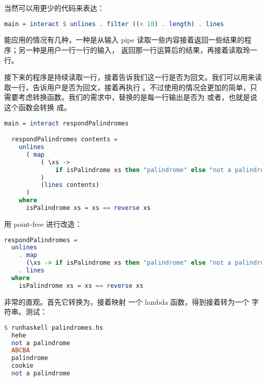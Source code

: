 \documentclass[./main.tex]{subfiles}
\begin{document}
当然可以用更少的代码来表达：

\begin{lstlisting}[language=Haskell]
  main = interact $ unlines . filter ((< 10) . length) . lines
\end{lstlisting}

能应用的情况有几种，一种是从输入 pipe 读取一些内容接着返回一些结果的程序；另一种是用户一行一行的输入，
返回那一行运算后的结果，再接着读取玲一行。

接下来的程序是持续读取一行，接着告诉我们这一行是否为回文。我们可以用来读取一行，告诉用户是否为回文，接着再执行
。不过使用的情况会更加的简单，只需要考虑转换函数。我们的需求中，替换的是每一行输出是否为
或者，也就是说这个函数会转换
成。

\begin{lstlisting}[language=Haskell]
  main = interact respondPalindromes

  respondPalindromes contents =
    unlines
      ( map
          ( \xs ->
              if isPalindrome xs then "palindrome" else "not a palindrome"
          )
          (lines contents)
      )
    where
      isPalindrome xs = xs == reverse xs
\end{lstlisting}

用 point-free 进行改造：

\begin{lstlisting}[language=Haskell]
  respondPalindromes =
  unlines
    . map
      (\xs -> if isPalindrome xs then "palindrome" else "not a palindrome")
    . lines
  where
    isPalindrome xs = xs == reverse xs
\end{lstlisting}

非常的直观。首先它转换为，接着映射
一个 lambda 函数，得到接着转为一个
字符串。测试：

\begin{lstlisting}[language=Haskell]
  $ runhaskell palindromes.hs
  hehe
  not a palindrome
  ABCBA
  palindrome
  cookie
  not a palindrome
\end{lstlisting}
\end{document}
